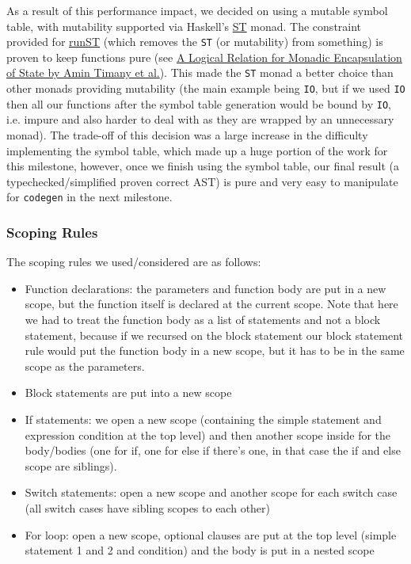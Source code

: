 \documentclass[11pt]{article}
\begin{document}
As a result of this performance impact, we decided on using a
mutable symbol table, with mutability supported via Haskell's
\href{https://hackage.haskell.org/package/base-4.12.0.0/docs/Control-Monad-ST.html}{ST}
monad. The constraint provided for
\href{https://hackage.haskell.org/package/base-4.12.0.0/docs/Control-Monad-ST.html\#v:runST}{runST}
(which removes the \texttt{ST} (or mutability) from something) is proven
to keep functions pure (see
\href{https://iris-project.org/pdfs/2018-popl-runST-final.pdf}{A
Logical Relation for Monadic Encapsulation of State by Amin Timany
et al.}). This made the \texttt{ST} monad a better choice than other
monads providing mutability (the main example being \texttt{IO}, but if we
used \texttt{IO} then all our functions after the symbol table generation
would be bound by \texttt{IO}, i.e. impure and also harder to deal with as
they are wrapped by an unnecessary monad). The trade-off of this
decision was a large increase in the difficulty implementing the
symbol table, which made up a huge portion of the work for this
milestone, however, once we finish using the symbol table, our
final result (a typechecked/simplified proven correct AST) is pure
and very easy to manipulate for \texttt{codegen} in the next milestone.
\subsubsection{Scoping Rules}
\label{sec:orged97ce6}
The scoping rules we used/considered are as follows:
\begin{itemize}
\item Function declarations: the parameters and function body are put
in a new scope, but the function itself is declared at the
current scope. Note that here we had to treat the function body
as a list of statements and not a block statement, because if we
recursed on the block statement our block statement rule would
put the function body in a new scope, but it has to be in the
same scope as the parameters.
\item Block statements are put into a new scope
\item If statements: we open a new scope (containing the simple
statement and expression condition at the top level) and then
another scope inside for the body/bodies (one for if, one for
else if there's one, in that case the if and else scope are
siblings).
\item Switch statements: open a new scope and another scope for each
switch case (all switch cases have sibling scopes to each other)
\item For loop: open a new scope, optional clauses are put at the top
level (simple statement 1 and 2 and condition) and the body is
put in a nested scope
\end{itemize}
\end{document}
